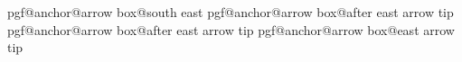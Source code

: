 {{                \fi%
            \else%
                    {\csname pgf@anchor@arrow box@south east\endcsname}%
                \ifdim\externalangle pt<\pgfmathresult pt\relax%
                    \pgfmathanglebetweenpoints{\referencepoint}%
                        {\csname pgf@anchor@arrow box@before south arrow tip\endcsname}%
                    \ifdim\externalangle pt<\pgfmathresult pt\relax%
                        \def\firstpoint{south arrow tip}%
                        \def\secondpoint{before south arrow tip}%
                    \else%
                        \pgfmathanglebetweenpoints{\referencepoint}%
                            {\csname pgf@anchor@arrow box@before south arrow\endcsname}%
                        \ifdim\externalangle pt<\pgfmathresult pt\relax%
                            \def\firstpoint{before south arrow head}%
                            \def\secondpoint{before south arrow}%
                        \else%
                            \def\firstpoint{before south arrow}%
                            \def\secondpoint{south east}%
                        \fi%
                    \fi%
                \else%
                        {\csname pgf@anchor@arrow box@after east arrow tip\endcsname}%
                    \ifdim\externalangle pt<\pgfmathresult pt\relax%
                        \pgfmathanglebetweenpoints{\referencepoint}%
                            {\csname pgf@anchor@arrow box@after east arrow\endcsname}%
                        \ifdim\externalangle pt<\pgfmathresult pt\relax%
                            \def\firstpoint{south east}%
                            \def\secondpoint{after east arrow}%
                        \else%
                            \def\firstpoint{after east arrow}%
                            \def\secondpoint{after east arrow head}%
                        \fi%
                    \else%
                        \def\firstpoint{after east arrow tip}%
                        \def\secondpoint{east arrow tip}%
                    \fi%
                \fi%
            \fi%
        \fi%
            {\csname pgf@anchor@arrow box@\firstpoint\endcsname}%
            {\csname pgf@anchor@arrow box@\secondpoint\endcsname}%
    }%
}%




\endinput
